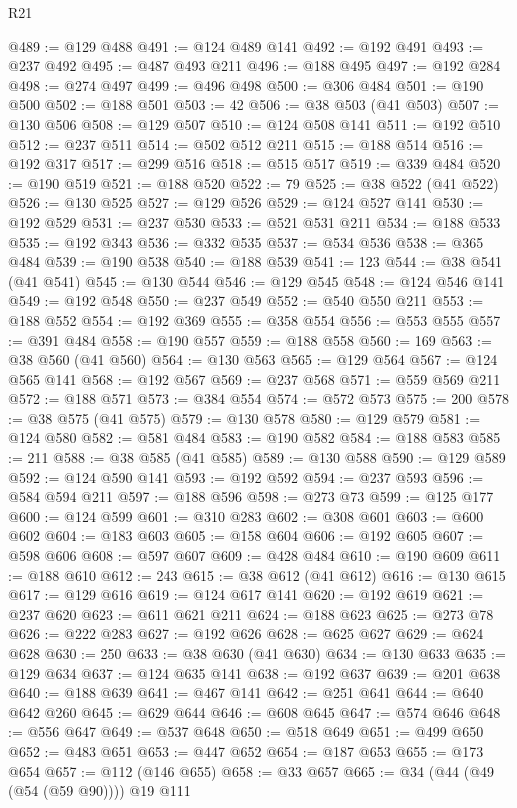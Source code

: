 \begin{lexlean}{R21}
\begin{coremodule}
@489 := @129 @488
@491 := @124 @489 @141
@492 := @192 @491
@493 := @237 @492
@495 := @487 @493 @211
@496 := @188 @495
@497 := @192 @284
@498 := @274 @497
@499 := @496 @498
@500 := @306 @484
@501 := @190 @500
@502 := @188 @501
@503 := 42
@506 := @38 @503 (@41 @503)
@507 := @130 @506
@508 := @129 @507
@510 := @124 @508 @141
@511 := @192 @510
@512 := @237 @511
@514 := @502 @512 @211
@515 := @188 @514
@516 := @192 @317
@517 := @299 @516
@518 := @515 @517
@519 := @339 @484
@520 := @190 @519
@521 := @188 @520
@522 := 79
@525 := @38 @522 (@41 @522)
@526 := @130 @525
@527 := @129 @526
@529 := @124 @527 @141
@530 := @192 @529
@531 := @237 @530
@533 := @521 @531 @211
@534 := @188 @533
@535 := @192 @343
@536 := @332 @535
@537 := @534 @536
@538 := @365 @484
@539 := @190 @538
@540 := @188 @539
@541 := 123
@544 := @38 @541 (@41 @541)
@545 := @130 @544
@546 := @129 @545
@548 := @124 @546 @141
@549 := @192 @548
@550 := @237 @549
@552 := @540 @550 @211
@553 := @188 @552
@554 := @192 @369
@555 := @358 @554
@556 := @553 @555
@557 := @391 @484
@558 := @190 @557
@559 := @188 @558
@560 := 169
@563 := @38 @560 (@41 @560)
@564 := @130 @563
@565 := @129 @564
@567 := @124 @565 @141
@568 := @192 @567
@569 := @237 @568
@571 := @559 @569 @211
@572 := @188 @571
@573 := @384 @554
@574 := @572 @573
@575 := 200
@578 := @38 @575 (@41 @575)
@579 := @130 @578
@580 := @129 @579
@581 := @124 @580
@582 := @581 @484
@583 := @190 @582
@584 := @188 @583
@585 := 211
@588 := @38 @585 (@41 @585)
@589 := @130 @588
@590 := @129 @589
@592 := @124 @590 @141
@593 := @192 @592
@594 := @237 @593
@596 := @584 @594 @211
@597 := @188 @596
@598 := @273 @73
@599 := @125 @177
@600 := @124 @599
@601 := @310 @283
@602 := @308 @601
@603 := @600 @602
@604 := @183 @603
@605 := @158 @604
@606 := @192 @605
@607 := @598 @606
@608 := @597 @607
@609 := @428 @484
@610 := @190 @609
@611 := @188 @610
@612 := 243
@615 := @38 @612 (@41 @612)
@616 := @130 @615
@617 := @129 @616
@619 := @124 @617 @141
@620 := @192 @619
@621 := @237 @620
@623 := @611 @621 @211
@624 := @188 @623
@625 := @273 @78
@626 := @222 @283
@627 := @192 @626
@628 := @625 @627
@629 := @624 @628
@630 := 250
@633 := @38 @630 (@41 @630)
@634 := @130 @633
@635 := @129 @634
@637 := @124 @635 @141
@638 := @192 @637
@639 := @201 @638
@640 := @188 @639
@641 := @467 @141
@642 := @251 @641
@644 := @640 @642 @260
@645 := @629 @644
@646 := @608 @645
@647 := @574 @646
@648 := @556 @647
@649 := @537 @648
@650 := @518 @649
@651 := @499 @650
@652 := @483 @651
@653 := @447 @652
@654 := @187 @653
@655 := @173 @654
@657 := @112 (@146 @655)
@658 := @33 @657
@665 := @34 (@44 (@49 (@54 (@59 @90)))) @19 @111

\end{coremodule}
\end{lexlean}
